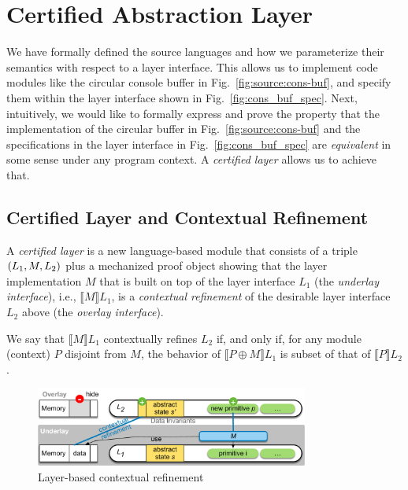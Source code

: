 \section{Certified Abstraction Layer} 

We have formally defined the source languages and how we parameterize
their semantics with respect to a layer interface. 
This allows us to implement code modules like the circular console
buffer in Fig.~\ref{fig:source:cons-buf}, and specify them
within the layer interface shown in Fig.~\ref{fig:cons_buf_spec}.
Next, intuitively, we would like
to formally express and prove the property that the implementation
of the circular buffer in Fig.~\ref{fig:source:cons-buf} and the specifications
in the layer interface in Fig.~\ref{fig:cons_buf_spec} are {\em equivalent}
in some sense under any program context. 
A {\em certified layer} allows us to achieve that.

\subsection{Certified Layer and Contextual Refinement}

A {\em certified layer} is a new language-based
module that consists of a triple $(L_1,M,L_2)$ plus a mechanized proof
object showing that the layer implementation $M$ that is built on top of the
layer interface $L_1$ (the {\em underlay interface}), i.e.,
$\llbracket{}M\rrbracket{}L_1$, is a {\em contextual refinement} of the
desirable layer interface $L_2$ above (the {\em overlay interface}).

\begin{definition}
We say that $\llbracket{}M\rrbracket{}L_1$ contextually refines
$L_2$ if, and only if, for any module (context) $P$ disjoint from $M$,
the behavior of $\llbracket{}{P \oplus M}\rrbracket{}L_1$ is subset of
that of $\llbracket{}P\rrbracket{}L_2$.
\end{definition}

\begin{figure}
\begin{center}
\includegraphics[width=0.8\textwidth]{figs/object-original}
\end{center}
\caption{Layer-based contextual refinement}
\label{fig:spec:object-original}
\end{figure}


